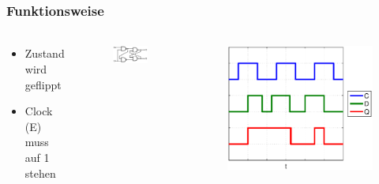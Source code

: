 \begin{frame}
    \frametitle{Funktionsweise}
    \framesubtitle{}
    \begin{columns}[c]
            \begin{block}{}
                \begin{itemize}
                    \item Zustand wird geflippt
                    \item Clock (E) muss auf 1 stehen
                \end{itemize}
            \end{block}
            \begin{figure}[H]
            \begin{center}
                    \includegraphics[scale=0.6]{./img/schaltung/D-Latch.png}
            \end{center}
            \end{figure}
            \begin{figure}[H]
            \begin{center}
                    \includegraphics[scale=0.3]{./img/Aufgabe_2_c.eps}
            \end{center}
            \end{figure}
    \end{columns}
\end{frame}
